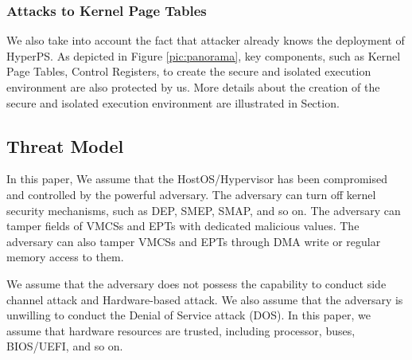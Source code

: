 \subsubsection{Attacks to Kernel Page Tables}
We also take into account the fact that attacker already knows the deployment of HyperPS. As depicted in Figure \ref{pic:panorama}, key components, such as Kernel Page Tables, Control Registers, to create the secure and isolated execution environment are also protected by us. More details about the creation of the secure and isolated execution environment are illustrated in Section. 
 
\subsection{Threat Model} \label{sub:threatmodel}
In this paper, 
We assume that the HostOS/Hypervisor has been compromised and controlled by the powerful adversary. The adversary can turn off kernel security mechanisms, such as DEP, SMEP, SMAP, and so on. The adversary can tamper fields of VMCSs and EPTs with dedicated malicious values. The adversary can also tamper VMCSs and EPTs through DMA write or regular memory access to them.  

We assume that the adversary does not possess the capability to conduct side channel attack and Hardware-based attack. We also assume that the adversary is unwilling to conduct the Denial of Service attack (DOS). In this paper, we assume that hardware resources are trusted, including processor, buses, BIOS/UEFI, and so on. 

















